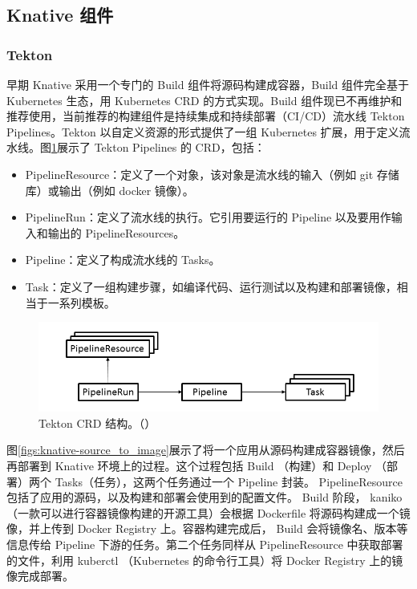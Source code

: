 \documentclass[11pt]{article}
\begin{document}
\subsection{Knative 组件}
\subsubsection{Tekton} \label{Tekton}
早期 Knative 采用一个专门的 Build 组件将源码构建成容器，Build 组件完全基于 Kubernetes 生态，用 Kubernetes CRD 的方式实现。Build 组件现已不再维护和推荐使用，当前推荐的构建组件是持续集成和持续部署（CI/CD）流水线 Tekton Pipelines。Tekton 以自定义资源的形式提供了一组 Kubernetes 扩展，用于定义流水线。图\ref{figs:knative-TektonPipeline}展示了 Tekton Pipelines 的 CRD\cite{knative-TektonPipeline}，包括：
\begin{itemize}
	\item PipelineResource：定义了一个对象，该对象是流水线的输入（例如 git 存储库）或输出（例如 docker 镜像）。
	\item PipelineRun：定义了流水线的执行。它引用要运行的 Pipeline 以及要用作输入和输出的 PipelineResources。
	\item Pipeline：定义了构成流水线的 Tasks。
	\item Task：定义了一组构建步骤，如编译代码、运行测试以及构建和部署镜像，相当于一系列模板。
\end{itemize}

\begin{figure}[!htbp]
	\centering
	\includegraphics[width=0.8\linewidth]{figs/knative-TektonPipeline}
	\caption{Tekton CRD 结构。（\cite{knative-TektonPipeline}）}
	\label{figs:knative-TektonPipeline}
\end{figure}

图\ref{figs:knative-source_to_image}展示了将一个应用从源码构建成容器镜像，然后再部署到 Knative 环境上的过程\cite{knative-source_to_image}。这个过程包括 Build （构建）和 Deploy （部署）两个 Tasks（任务），这两个任务通过一个 Pipeline 封装。 PipelineResource 包括了应用的源码，以及构建和部署会使用到的配置文件。 Build 阶段， kaniko （一款可以进行容器镜像构建的开源工具）会根据 Dockerfile 将源码构建成一个镜像，并上传到 Docker Registry 上。容器构建完成后， Build 会将镜像名、版本等信息传给 Pipeline 下游的任务。第二个任务同样从 PipelineResource 中获取部署的文件，利用 kuberctl （Kubernetes 的命令行工具）将 Docker Registry 上的镜像完成部署。
\end{document}
